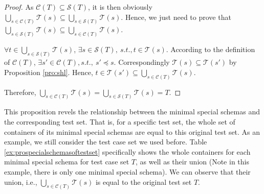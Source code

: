 \begin{proof}
As $\mathcal{C}(T) \subseteq \mathcal{S}(T)$,  it is then obviously $\bigcup_{s \in \mathcal{C}(T)} \mathcal{T}(s) \subseteq \bigcup_{s \in \mathcal{S}(T)} \mathcal{T}(s)$. Hence, we just need to prove that $\bigcup_{s \in \mathcal{S}(T)} \mathcal{T}(s) \subseteq \bigcup_{s \in \mathcal{C}(T)} \mathcal{T}(s)$.

$\forall t \in \bigcup_{s \in \mathcal{S}(T)} \mathcal{T}(s) $, $\exists s \in \mathcal{S}(T),\ s.t., t \in \mathcal{T}(s)$. According to the definition of $\mathcal{C}(T)$, $\exists s' \in \mathcal{C}(T), s.t.,\ s' \preceq s$. Correspondingly $\mathcal{T}(s) \subseteq \mathcal{T}(s')$ by Proposition \ref{pro:shl}. Hence, $t \in \mathcal{T}(s') \subseteq \bigcup_{s \in \mathcal{C}(T)} \mathcal{T}(s)$.

Therefore, $\bigcup_{s \in \mathcal{C}(T)} \mathcal{T}(s) = \bigcup_{s \in \mathcal{S}(T)} \mathcal{T}(s) = T$.
\end{proof}


This proposition revels the relationship between the minimal special schemas and the corresponding test set. That is, for a specific test set, the whole set of containers of its minimal special schemas are equal to this original test set. As an example, we still consider the test case set we used before. Table \ref{ex:prospecialschemasoftestset} specifically shows the whole containers for each minimal special schema for test case set $T$, as well as their union (Note in this example, there is only one minimal special schema). We can observe that their union, i.e.,  $\bigcup_{s \in \mathcal{C}(T)}\mathcal{T}(s)$ is equal to the original test set $T$.

